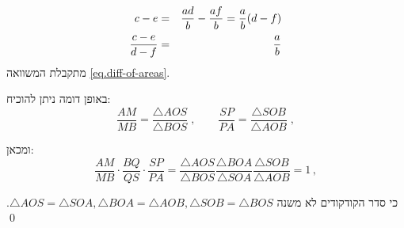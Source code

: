 \begin{eqnarray*}
c-e &=& \displaystyle\frac{ad}{b} - \displaystyle\frac{af}{b}= \displaystyle\frac{a}{b}(d-f)\\
\displaystyle\frac{c-e}{d-f} &=& \displaystyle\frac{a}{b}
\end{eqnarray*}
מתקבלת המשוואה
\ref{eq.diff-of-areas}.

באופן דומה ניתן להוכיח:
\[
\frac{AM}{MB} = \frac{\triangle AOS}{\triangle BOS}\;,\quad\quad \frac{SP}{PA} =\frac{\triangle SOB}{\triangle AOB}\;,
\]

ומכאן:
\[
\frac{AM}{MB}\cdot\frac{BQ}{QS}\cdot\frac{SP}{PA} = \frac{\triangle AOS}{\triangle BOS}\frac{\triangle BOA}{\triangle SOA}\frac{\triangle SOB}{\triangle AOB}=1\,,
\]

כי סדר הקודקודים  לא משנה
$\triangle AOS\!=\!\triangle SOA, \triangle BOA\!=\!\triangle AOB, \triangle SOB\!=\!\triangle BOS$.
\qed

\medskip

